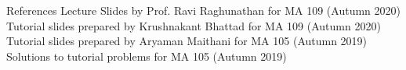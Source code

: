 \documentclass[aspectratio=169]{beamer}
\begin{document}
\begin{frame}{References}
    Lecture Slides by Prof. Ravi Raghunathan for MA 109 (Autumn 2020) \\
    Tutorial slides prepared by Krushnakant Bhattad for MA 109 (Autumn 2020) \\
    Tutorial slides prepared by Aryaman Maithani for MA 105 (Autumn 2019) \\
    Solutions to tutorial problems for MA 105 (Autumn 2019) \\
\end{frame}
\end{document}

